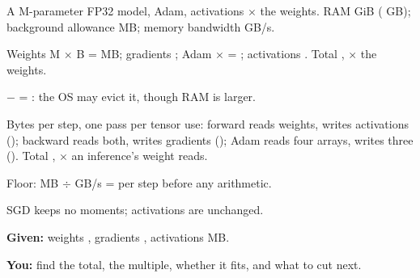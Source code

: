 \documentclass{studysheet}
\begin{document}
\begin{leftcol}
\begin{practicebox}
A M-parameter FP32 model, Adam, activations $\times$ the weights.
RAM  GiB ( GB); background allowance  MB; memory bandwidth  GB/s.
\begin{steps}
\item Weights M $\times$  B =  MB; gradients ;
  Adam  $\times$  = ; activations . Total ,
  $\times$ the weights.
\item {} $-$  = : the OS may evict
  it, though RAM is larger.
\item Bytes per step, one pass per tensor use: forward reads weights, writes activations ();
  backward reads both, writes gradients (); Adam reads four arrays, writes three (). Total , $\times$ an inference's weight reads.
\item Floor:  MB $\div$  GB/s =  per step before any arithmetic.
\end{steps}
\end{practicebox}

\vspace{10pt}
\begin{practicebox}
SGD keeps no moments; activations are unchanged.\par\vspace{4pt}
\textbf{Given:} weights , gradients , activations  MB.\par
\textbf{You:} find the total, the multiple, whether it fits, and what to cut next.
\end{practicebox}
\end{leftcol}%
\end{document}
